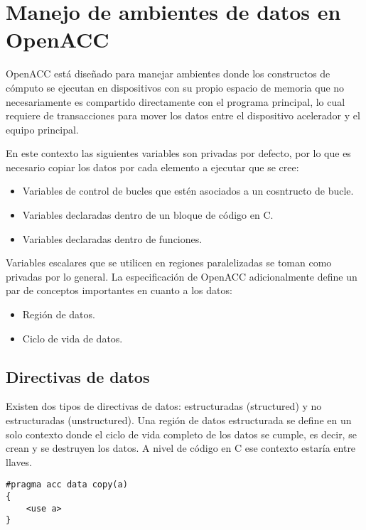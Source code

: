 \chapter{Manejo de ambientes de datos en OpenACC}
OpenACC está diseñado para manejar ambientes donde los constructos de cómputo se ejecutan en dispositivos con su propio espacio de memoria que no necesariamente es compartido directamente con el programa principal, lo cual requiere de transacciones para mover los datos entre el dispositivo acelerador y el equipo principal.

En este contexto las siguientes variables son privadas por defecto, por lo que es necesario copiar los datos por cada elemento a ejecutar que se cree:

\begin{itemize}
    \item Variables de control de bucles que estén asociados a un cosntructo de bucle.
    \item Variables declaradas dentro de un bloque de código en C.
    \item Variables declaradas dentro de funciones.
\end{itemize}

Variables escalares que se utilicen en regiones paralelizadas se toman como privadas por lo general. La especificación de OpenACC adicionalmente define un par de conceptos importantes en cuanto a los datos:

\begin{itemize}
    \item Región de datos.
    \item Ciclo de vida de datos.
\end{itemize}

\section{Directivas de datos}
Existen dos tipos de directivas de datos: estructuradas (structured) y no estructuradas (unstructured). Una región de datos estructurada se define en un solo contexto donde el ciclo de vida completo de los datos se cumple, es decir, se crean y se destruyen los datos. A nivel de código en C ese contexto estaría entre llaves.

\begin{lstlisting}[style=CStyle]
#pragma acc data copy(a)
{
    <use a>
}
\end{lstlisting}

